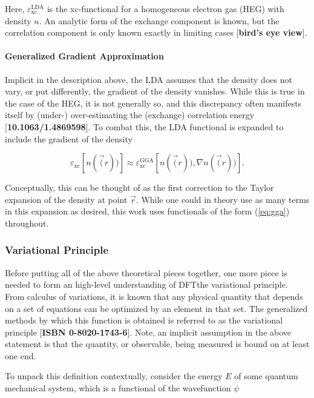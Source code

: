         \noindent Here, $\varepsilon_\text{xc}^\text{LDA}$ is the xc-functional for a homogeneous electron gas (HEG) with density $n$. An analytic form of the exchange component is known, but the correlation component is only known exactly in limiting cases [\textbf{bird's eye view}]. 
        
        \paragraph{Generalized Gradient Approximation} Implicit in the description above, the LDA assumes that the density does not vary, or put differently, the gradient of the density vanishes. While this is true in the case of the HEG, it is not generally so, and this discrepancy often manifests itself by (under-) over-estimating the (exchange) correlation energy [\textbf{10.1063/1.4869598}]. To combat this, the LDA functional is expanded to include the gradient of the density 
        
        \begin{equation}
        \label{eq:gga}
            \varepsilon_\text{xc}[n(\vec(r))] \approx \varepsilon_\text{xc}^\text{GGA}[n(\vec(r)),\nabla n(\vec(r))].
        \end{equation}
        
        \noindent Conceptually, this can be thought of as the first correction to the Taylor expansion of the density at point $\vec{r}$. While one could in theory use as many terms in this expansion as desired, this work uses functionals of the form (\ref{eq:gga}) throughout.
        
        \subsubsection{Variational Principle}
        
        Before putting all of the above theoretical pieces together, one more piece is needed to form an high-level understanding of DFT\textemdash the variational principle. From calculus of variations, it is known that any physical quantity that depends on a set of equations can be optimized by an element in that set. The generalized methods by which this function is obtained is referred to as the variational principle [\textbf{ISBN 0-8020-1743-6}]. Note, an implicit assumption in the above statement is that the quantity, or observable, being measured is bound on at least one end.
        
        To unpack this definition contextually, consider the energy $E$ of some quantum mechanical system, which is a functional of the wavefunction $\psi$
        
